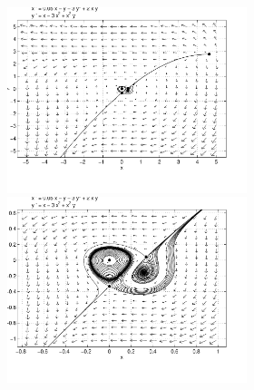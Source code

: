 \documentclass{ximera}
\begin{document}
\begin{computerExercise}
\begin{solution}
\begin{figure}[htb]
                       \centerline{%
                        \includegraphics[width=2.75in]{exfigure/8-4-5b.pdf}
			\includegraphics[width=2.75in]{exfigure/8-4-5b2.pdf}}
\end{figure}



\end{solution}
\end{computerExercise}
\end{document}
